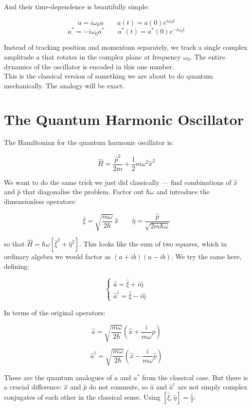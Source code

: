 \documentclass[krantz1,ChapterTOCs]{krantz}
\begin{document}
And their time-dependence is beautifully simple:

$$\boxed{\dot{a} = i\omega_0 a \qquad a(t) = a(0)e^{i\omega_0 t}}$$
$$\boxed{\dot{a}^* = -i\omega_0 a^* \qquad a^*(t) = a^*(0)e^{-i\omega_0 t}}$$

Instead of tracking position and momentum separately, we track 
a single complex amplitude $a$ that rotates in the complex plane 
at frequency $\omega_0$. The entire dynamics of the oscillator 
is encoded in this one number.\\

This is the classical version of something we are about to do 
quantum mechanically. The analogy will be exact.\\

\section*{The Quantum Harmonic Oscillator}

The Hamiltonian for the quantum harmonic oscillator is:

$$\hat{H} = \frac{\hat{p}^2}{2m} + \frac{1}{2}m\omega^2\hat{x}^2$$

We want to do the same trick we just did classically --- find 
combinations of $\hat{x}$ and $\hat{p}$ that diagonalise the 
problem. Factor out $\hbar\omega$ and introduce the dimensionless 
operators:

$$\hat{\xi} = \sqrt{\frac{m\omega}{2\hbar}}\,\hat{x} \qquad 
\hat{\eta} = \frac{\hat{p}}{\sqrt{2m\hbar\omega}}$$

so that $\hat{H} = \hbar\omega\left[\hat{\xi}^2 + \hat{\eta}^2\right]$. 
This looks like the sum of two squares, which in ordinary algebra 
we would factor as $(a+ib)(a-ib)$. We try the same here, defining:

$$\begin{cases}
\hat{a} = \hat{\xi} + i\hat{\eta} \\[4pt]
\hat{a}^\dagger = \hat{\xi} - i\hat{\eta}
\end{cases}$$

In terms of the original operators:

$$\boxed{\hat{a} = \sqrt{\frac{m\omega}{2\hbar}}
\left(\hat{x} + \frac{i}{m\omega}\hat{p}\right)}$$

$$\boxed{\hat{a}^\dagger = \sqrt{\frac{m\omega}{2\hbar}}
\left(\hat{x} - \frac{i}{m\omega}\hat{p}\right)}$$

These are the quantum analogues of $a$ and $a^*$ from the 
classical case. But there is a crucial difference: $\hat{x}$ 
and $\hat{p}$ do not commute, so $\hat{a}$ and $\hat{a}^\dagger$ 
are not simply complex conjugates of each other in the classical 
sense. Using $[\hat{\xi}, \hat{\eta}] = \frac{i}{2}$:
\end{document}
